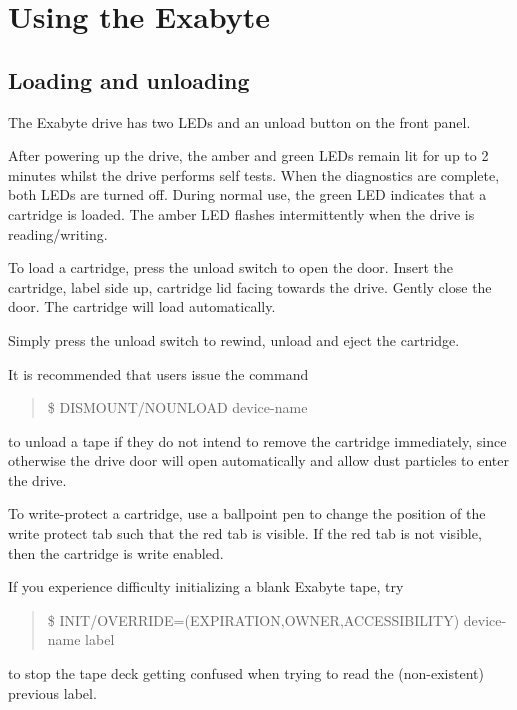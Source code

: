 \section{Using the Exabyte}

\subsection{Loading and unloading}

The Exabyte drive has two LEDs and an unload button on the front panel.

After powering up the drive, the amber and green LEDs remain lit for
up to 2 minutes whilst the drive performs self tests. When the diagnostics are
complete, both LEDs are turned off. During normal use, the green LED indicates
that a cartridge is loaded. The amber LED flashes intermittently when
the drive is reading/writing.

To load a cartridge, press the unload switch to open the door. Insert the
cartridge, label side up, cartridge lid facing towards the drive.
Gently close the door. The cartridge will load automatically.

Simply press the unload switch to rewind, unload and eject the cartridge.

It is recommended that users issue the command

\begin{quote}\tt

\$ DISMOUNT/NOUNLOAD device-name

\end{quote}

to unload a tape if they do not intend to remove the cartridge immediately,
since otherwise the drive door will open automatically and allow dust
particles to enter the drive.

To write-protect a cartridge, use a ballpoint pen to change the
position of the write protect tab such that the red tab is visible.
If the red tab is not visible, then the cartridge is write enabled.

If you experience difficulty initializing a blank Exabyte tape, try

\begin{quote}\tt

\$ INIT/OVERRIDE=(EXPIRATION,OWNER,ACCESSIBILITY) device-name label

\end{quote}

to stop the tape deck getting confused when trying to read the
(non-existent) previous label.

